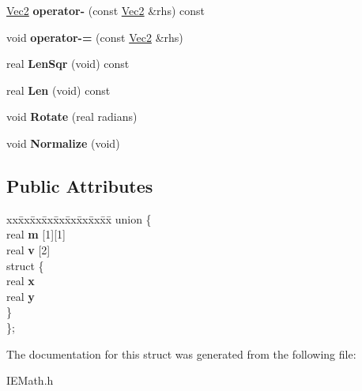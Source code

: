 \begin{DoxyCompactItemize}
\item 
\mbox{\label{struct_vec2_a6c757ff81021ae3ffabf06a6afcdb6bd}} 
\mbox{\hyperlink{struct_vec2}{Vec2}} {\bfseries operator-\/} (const \mbox{\hyperlink{struct_vec2}{Vec2}} \&rhs) const
\item 
\mbox{\label{struct_vec2_afb078fac709c7bd64b6c92567a310563}} 
void {\bfseries operator-\/=} (const \mbox{\hyperlink{struct_vec2}{Vec2}} \&rhs)
\item 
\mbox{\label{struct_vec2_adb82107cd6ae9725ca606ad64ff1ce36}} 
real {\bfseries Len\+Sqr} (void) const
\item 
\mbox{\label{struct_vec2_ab268b54ca012575edd021412bfdbaf91}} 
real {\bfseries Len} (void) const
\item 
\mbox{\label{struct_vec2_a36c8e58b7451526e4280deef8caf904e}} 
void {\bfseries Rotate} (real radians)
\item 
\mbox{\label{struct_vec2_ab37a161e393133ba7083d3f9386c0173}} 
void {\bfseries Normalize} (void)
\end{DoxyCompactItemize}
\subsection*{Public Attributes}
\begin{DoxyCompactItemize}
\item 
\mbox{\label{struct_vec2_a82bb422b66a9d3d85f8e85c5ad4cc477}} 
\begin{tabbing}
xx\=xx\=xx\=xx\=xx\=xx\=xx\=xx\=xx\=\kill
union \{\\
\>real {\bfseries m} \mbox{[}1\mbox{]}\mbox{[}1\mbox{]}\\
\>real {\bfseries v} \mbox{[}2\mbox{]}\\
\mbox{\label{union_vec2_1_1_0D0_a457fc8733fab6c5d599114de82663036}} 
\>struct \{\\
\>\>real {\bfseries x}\\
\>\>real {\bfseries y}\\
\>\} \\
\}; \\

\end{tabbing}\end{DoxyCompactItemize}


The documentation for this struct was generated from the following file\+:\begin{DoxyCompactItemize}
\item 
I\+E\+Math.\+h\end{DoxyCompactItemize}
